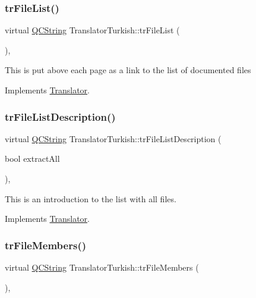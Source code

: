 \subsubsection{\texorpdfstring{trFileList()}{trFileList()}}
{\footnotesize\ttfamily virtual \mbox{\hyperlink{class_q_c_string}{Q\+C\+String}} Translator\+Turkish\+::tr\+File\+List (\begin{DoxyParamCaption}{ }\end{DoxyParamCaption})\hspace{0.3cm}{\ttfamily [inline]}, {\ttfamily [virtual]}}

This is put above each page as a link to the list of documented files 

Implements \mbox{\hyperlink{class_translator}{Translator}}.

\mbox{\label{class_translator_turkish_aead5bac97fc16b863f1f37eafb270e98}} 
\subsubsection{\texorpdfstring{trFileListDescription()}{trFileListDescription()}}
{\footnotesize\ttfamily virtual \mbox{\hyperlink{class_q_c_string}{Q\+C\+String}} Translator\+Turkish\+::tr\+File\+List\+Description (\begin{DoxyParamCaption}\item[{bool}]{extract\+All }\end{DoxyParamCaption})\hspace{0.3cm}{\ttfamily [inline]}, {\ttfamily [virtual]}}

This is an introduction to the list with all files. 

Implements \mbox{\hyperlink{class_translator}{Translator}}.

\mbox{\label{class_translator_turkish_a42ca58eaa8f781f8f9eafb7931c83de4}} 
\subsubsection{\texorpdfstring{trFileMembers()}{trFileMembers()}}
{\footnotesize\ttfamily virtual \mbox{\hyperlink{class_q_c_string}{Q\+C\+String}} Translator\+Turkish\+::tr\+File\+Members (\begin{DoxyParamCaption}{ }\end{DoxyParamCaption})\hspace{0.3cm}{\ttfamily [inline]}, {\ttfamily [virtual]}}

